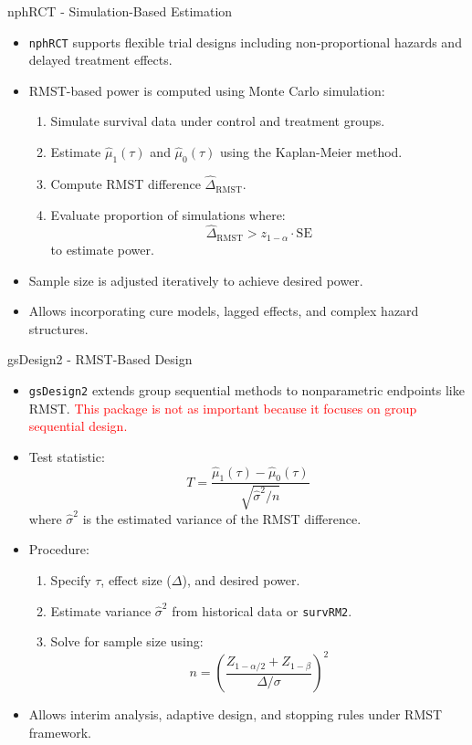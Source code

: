\documentclass{beamer}
\begin{document}
\begin{frame}{nphRCT - Simulation-Based Estimation}
\begin{itemize}
    \item \texttt{nphRCT} supports flexible trial designs including non-proportional hazards and delayed treatment effects.

    \item RMST-based power is computed using Monte Carlo simulation:
    \begin{enumerate}
        \item Simulate survival data under control and treatment groups.
        \item Estimate $\hat{\mu}_1(\tau)$ and $\hat{\mu}_0(\tau)$ using the Kaplan-Meier method.
        \item Compute RMST difference $\hat{\Delta}_{\text{RMST}}$.
        \item Evaluate proportion of simulations where:
        \[
        \hat{\Delta}_{\text{RMST}} > z_{1-\alpha} \cdot \text{SE}
        \]
        to estimate power.
    \end{enumerate}

    \item Sample size is adjusted iteratively to achieve desired power.
    \item Allows incorporating cure models, lagged effects, and complex hazard structures.
\end{itemize}
\end{frame}

\begin{frame}{gsDesign2 - RMST-Based Design}
\begin{itemize}
    \item \texttt{gsDesign2} extends group sequential methods to nonparametric endpoints like RMST. \textcolor{red}{This package is not as important because it focuses on group sequential design.}

    \item Test statistic:
    \[
    T = \frac{\hat{\mu}_1(\tau) - \hat{\mu}_0(\tau)}{\sqrt{\hat{\sigma}^2 / n}}
    \]
    where $\hat{\sigma}^2$ is the estimated variance of the RMST difference.

    \item Procedure:
    \begin{enumerate}
        \item Specify $\tau$, effect size ($\Delta$), and desired power.
        \item Estimate variance $\hat{\sigma}^2$ from historical data or \texttt{survRM2}.
        \item Solve for sample size using:
        \[
        n = \left( \frac{Z_{1-\alpha/2} + Z_{1-\beta}}{\Delta / \sigma} \right)^2
        \]
    \end{enumerate}

    \item Allows interim analysis, adaptive design, and stopping rules under RMST framework.
\end{itemize}
\end{frame}
\end{document}
